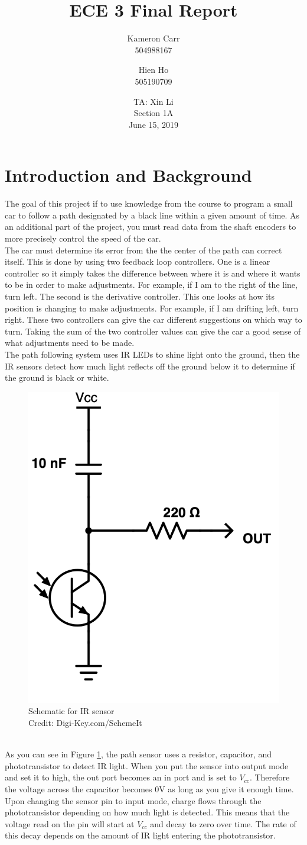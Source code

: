 \documentclass[12pt]{article}
\title{ECE 3 Final Report}
\author{Kameron Carr \\ 504988167 \and Hien Ho \\ 505190709}
\date{TA: Xin Li \\ Section 1A \\ June 15, 2019}
\begin{document}
\maketitle

\section{Introduction and Background}
The goal of this project if to use knowledge from the course to program a small car to follow a path designated by a black line within a given amount of time. As an additional part of the project, you must read data from the shaft encoders to more precisely control the speed of the car.
\\ 
The car must determine its error from the the center of the path can correct itself. This is done by using two feedback loop controllers. One is a linear controller so it simply takes the difference between where it is and where it wants to be in order to make adjustments. For example, if I am to the right of the line, turn left. The second is the derivative controller. This one looks at how its position is changing to make adjustments. For example, if I am drifting left, turn right. These two controllers can give the car different suggestions on which way to turn. Taking the sum of the two controller values can give the car a good sense of what adjustments need to be made.
\\ 
The path following system uses IR LEDs to shine light onto the ground, then the IR sensors detect how much light reflects off the ground below it to determine if the ground is black or white.
\begin{figure}[h]
  \begin{center}
  \includegraphics[width=0.2\linewidth]{IR-Sensor.png}
  \caption{Schematic for IR sensor\cite{stu} \\ Credit: Digi-Key.com/SchemeIt}
  \label{fig:sensor}
  \end{center}
\end{figure}
\\ 
As you can see in Figure \ref{fig:sensor}, the path sensor uses a resistor, capacitor, and phototransistor to detect IR light. When you put the sensor into output mode and set it to high, the out port becomes an in port and is set to $V_{cc}$. Therefore the voltage across the capacitor becomes 0V as long as you give it enough time. Upon changing the sensor pin to input mode, charge flows through the phototransistor depending on how much light is detected. This means that the voltage read on the pin will start at $V_{cc}$ and decay to zero over time. The rate of this decay depends on the amount of IR light entering the phototransistor\cite{stu}.
\end{document}

